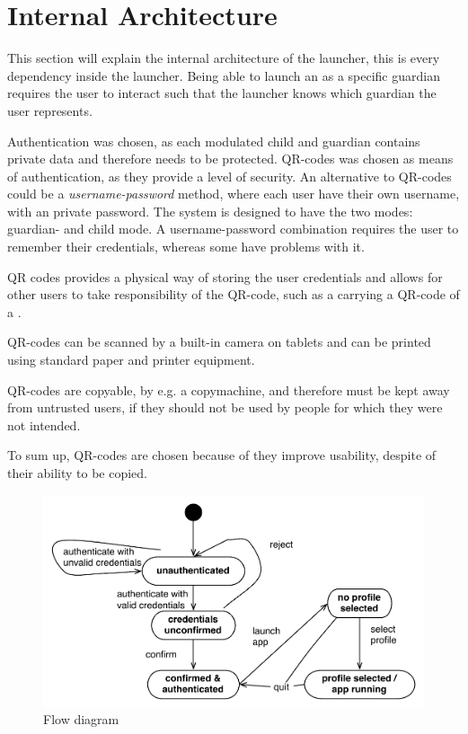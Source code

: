 \section{Internal Architecture}
This section will explain the internal architecture of the launcher, this is every dependency inside the launcher.
Being able to launch an \girafapp[] as a specific guardian requires the user to interact such that the launcher knows which guardian the user represents.

Authentication was chosen, as each modulated child and guardian contains private data and therefore needs to be protected. QR-codes was chosen as means of authentication, as they provide a level of security.
An alternative to QR-codes could be a \emph{username-password} method, where each user have their own username, with an private password. The system is designed to have the two modes: guardian- and child mode. A username-password combination requires the user to remember their credentials, whereas some \autists[] have problems with it. 

QR codes provides a physical way of storing the user credentials and allows for other users to take responsibility of the QR-code, such as a \guardian[] carrying a QR-code of a \autist[].

QR-codes can be scanned by a built-in camera on tablets and can be printed using standard paper and printer equipment. 

QR-codes are copyable, by e.g. a copymachine, and therefore must be kept away from untrusted users, if they should not be used by people for which they were not intended.

To sum up, QR-codes are chosen because of they improve usability, despite of their ability to be copied.

\begin{figure}[h]
	\centering
	\includegraphics[width=1\textwidth]{gfx/flow-diagram2.pdf}
	\caption{Flow diagram}
	\label{fig:flow_diagram}
\end{figure}

